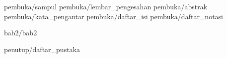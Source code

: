 \documentclass[a5paper, twoside, 11pt, listof=nochaptergap, bahasa] {book}
\begin{document}
\begin{sloppypar}
	
	\pagestyle {normal}
	
	\frontmatter
		 {pembuka/sampul}
		 {pembuka/lembar_pengesahan}
		 {pembuka/abstrak}
		 {pembuka/kata_pengantar}
		 {pembuka/daftar_isi}
		 {pembuka/daftar_notasi}
	
	\mainmatter
		 {bab2/bab2} \cleardoublepage
	
	\backmatter
	 	 {penutup/daftar_pustaka}
		
\end{sloppypar}
\end{document}

